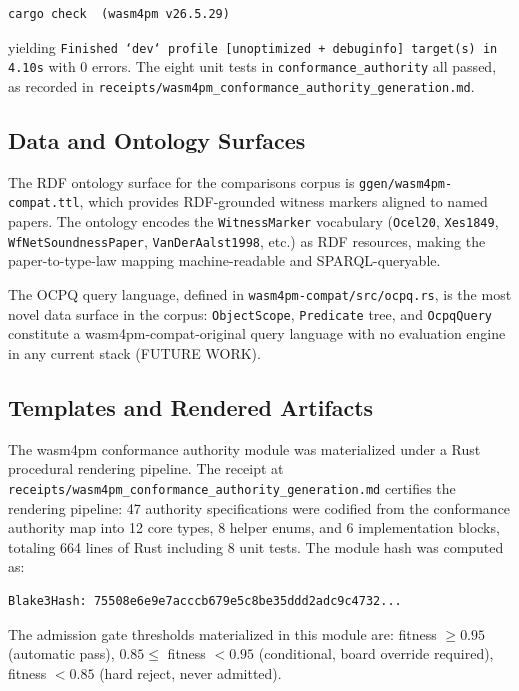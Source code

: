 \begin{verbatim}
cargo check  (wasm4pm v26.5.29)
\end{verbatim}

yielding \texttt{Finished `dev` profile [unoptimized + debuginfo] target(s) in 4.10s}
with 0 errors. The eight unit tests in \texttt{conformance\_authority} all passed,
as recorded in \texttt{receipts/wasm4pm\_conformance\_authority\_generation.md}.

\subsection{Data and Ontology Surfaces}
\label{sec:comparisons-impl-ontology}

The RDF ontology surface for the comparisons corpus is
\texttt{ggen/wasm4pm-compat.ttl}, which provides RDF-grounded witness markers
aligned to named papers. The ontology encodes the \texttt{WitnessMarker}
vocabulary (\texttt{Ocel20}, \texttt{Xes1849}, \texttt{WfNetSoundnessPaper},
\texttt{VanDerAalst1998}, etc.) as RDF resources, making the paper-to-type-law
mapping machine-readable and SPARQL-queryable.

The OCPQ query language, defined in \texttt{wasm4pm-compat/src/ocpq.rs}, is the
most novel data surface in the corpus: \texttt{ObjectScope}, \texttt{Predicate}
tree, and \texttt{OcpqQuery} constitute a wasm4pm-compat-original query language
with no evaluation engine in any current stack (FUTURE WORK).

\subsection{Templates and Rendered Artifacts}
\label{sec:comparisons-impl-rendered}

The wasm4pm conformance authority module was materialized under a Rust procedural
rendering pipeline. The receipt at \texttt{receipts/wasm4pm\_conformance\_authority\_generation.md}
certifies the rendering pipeline: 47 authority specifications were codified from
the conformance authority map into 12 core types, 8 helper enums, and 6
implementation blocks, totaling 664 lines of Rust including 8 unit tests.
The module hash was computed as:

\begin{verbatim}
Blake3Hash: 75508e6e9e7acccb679e5c8be35ddd2adc9c4732...
\end{verbatim}

The admission gate thresholds materialized in this module are:
fitness $\geq 0.95$ (automatic pass), $0.85 \leq$ fitness $< 0.95$ (conditional,
board override required), fitness $< 0.85$ (hard reject, never admitted).
